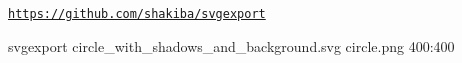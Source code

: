\href{https://github.com/shakiba/svgexport}{\tt https\+://github.\+com/shakiba/svgexport} \begin{DoxyVerb}    svgexport circle_with_shadows_and_background.svg circle.png 400:400\end{DoxyVerb}
 
